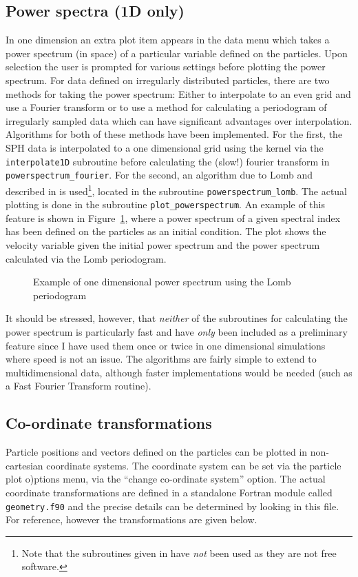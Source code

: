 \documentclass[a4paper,11pt]{article}
\begin{document}
\subsection{Power spectra (1D only)}
 In one dimension an extra plot item appears
in the data menu which takes a power spectrum (in space) of a particular
variable defined on the particles. Upon selection the user is prompted for
various settings before plotting the power spectrum. For data defined on
irregularly distributed particles, there are two methods for taking the power
spectrum: Either to interpolate to an even grid and use a Fourier
transform or to use a method for calculating a periodogram of
irregularly sampled data which can have significant advantages over
interpolation. Algorithms for both of these methods have been
implemented. For the first, the SPH data is interpolated to a one dimensional
grid using the kernel via the \verb+interpolate1D+ subroutine before calculating the (slow!) fourier
transform in \verb+powerspectrum_fourier+. For the second, an algorithm due to
Lomb and \citet{scargle81} described in \citet{numericalrecipes} is
used\footnote{Note that the subroutines given in \citet{numericalrecipes} have
\emph{not} been used as they are not free software.},
located in the subroutine \verb+powerspectrum_lomb+. The actual plotting is done
in the subroutine \verb+plot_powerspectrum+. An example of this feature is shown
in Figure~\ref{fig:powerspectrum_lomb}, where a power spectrum of a given
spectral index has been defined on the particles as an initial condition. The
plot shows the velocity variable given the initial power spectrum and the power
spectrum calculated via the Lomb periodogram.
\begin{figure}
\centering

\caption{Example of one dimensional power spectrum using the Lomb periodogram}
\label{fig:powerspectrum_lomb}
\end{figure}

 It should be stressed, however, that \emph{neither} of the subroutines for
calculating the power spectrum is particularly fast and have \emph{only} been included as a preliminary feature
since I have used them once or twice in one dimensional simulations where speed
is not an issue. The algorithms are fairly simple to extend to multidimensional
data, although faster implementations would be needed (such as a Fast
Fourier Transform routine).

\subsection{Co-ordinate transformations}
Particle positions and vectors defined on the particles can be plotted in non-cartesian coordinate
systems. The coordinate system can be set via the particle plot o)ptions menu, via the ``change co-ordinate
system'' option. The actual coordinate transformations are defined in a standalone Fortran module called
\verb+geometry.f90+ and the precise details can be determined by looking in this file. For reference, however the transformations are given below.
\end{document}
